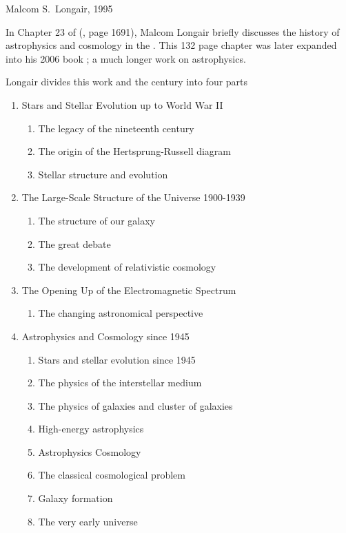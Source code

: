
Malcom S.\ Longair, 1995

In Chapter 23 of  (\cite{Physics1995},
page 1691), Malcom Longair \cite{Longair1995} briefly discusses the
history of astrophysics and cosmology in the .  This 132 page
chapter was later expanded into his 2006 book ;
a much longer work on  astrophysics.

Longair divides this work and the century into four parts

\begin{enumerate}
\item Stars and Stellar Evolution up to World War II
  \begin{enumerate}
  \item The legacy of the nineteenth century
  \item The origin of the Hertsprung-Russell diagram
  \item Stellar structure and evolution
  \end{enumerate}

\item The Large-Scale Structure of the Universe 1900-1939
  \begin{enumerate}
  \item The structure of our galaxy
  \item The great debate
  \item The development of relativistic cosmology
  \end{enumerate}

\item The Opening Up of the Electromagnetic Spectrum
  \begin{enumerate}
  \item The changing astronomical perspective
  \end{enumerate}

\item Astrophysics and Cosmology since 1945
  \begin{enumerate}
  \item Stars and stellar evolution since 1945
  \item The physics of the interstellar medium
  \item The physics of galaxies and cluster of galaxies
  \item High-energy astrophysics
  \item Astrophysics Cosmology
  \item The classical cosmological problem
  \item Galaxy formation
  \item The very early universe
  \end{enumerate}
\end{enumerate}

